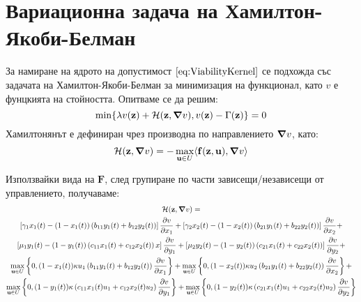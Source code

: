 \section{Вариационна задача на Хамилтон-Якоби-Белман}
За намиране на ядрото на допустимост $\eqref{eq:ViabilityKernel}$ се подхожда със задачата на Хамилтон-Якоби-Белман за минимизация на функционал, като $v$ е фунцкията на стойността. Опитваме се да решим:
\begin{equation}
  \label{eq:HJB}
  \min\{\lambda v(\mathbf{z}) + \mathcal{H}(\mathbf{z}, \grad{v}), v(\mathbf{z}) - \Gamma(\mathbf{z})\} = 0
\end{equation}
Хамилтонянът е дефиниран чрез производна по направлението $\grad{v}$, като:
\begin{equation}
  \label{eq:Hamiltonian}
  \mathcal{H}(\mathbf{z}, \grad{v}) = - \max_{\mathbf{u} \in U} \langle \mathbf{f}(\mathbf{z}, \mathbf{u}), \grad{v} \rangle
\end{equation}

Използвайки вида на $\mathbf{F}$, след групиране по части зависещи/независещи от управлението, получаваме:
\begin{multline}
  \label{eq:HamiltonianFull}
  \mathcal{H}(\mathbf{z}, \grad{v}) = \\
  \left[\gamma_1 x_1(t) - (1-x_1(t)) \left(b_{11} y_1(t) + b_{12} y_2(t)\right) \right] \pdv{v}{x_1} +
  \left[\gamma_2 x_2(t) - (1-x_2(t)) \left(b_{21} y_1(t) + b_{22} y_2(t)\right) \right] \pdv{v}{x_2} + \\
  \left[\mu_1 y_1(t) - (1-y_1(t)) \left(c_{11} x_1(t) + c_{12} x_2(t)\right) x\right] \pdv{v}{y_1} +
  \left[\mu_2 y_2(t) - (1-y_2(t)) \left(c_{21} x_1(t) + c_{22} x_2(t)\right)\right] \pdv{v}{y_2} + \\
  \max_{\mathbf{u} \in U}\left\{0, (1-x_1(t)) \kappa u_1 \left(b_{11} y_1(t) + b_{12} y_2(t)\right) \pdv{v}{x_1}\right\} +
  \max_{\mathbf{u} \in U}\left\{0, (1-x_2(t)) \kappa u_2 \left(b_{21} y_1(t) + b_{22} y_2(t)\right) \pdv{v}{x_2}\right\} + \\
  \max_{\mathbf{u} \in U}\left\{0, (1-y_1(t)) \kappa \left(c_{11} x_1(t) u_1 + c_{12} x_2(t) u_2 \right) \pdv{v}{y_1}\right\} +
  \max_{\mathbf{u} \in U}\left\{0, (1-y_2(t)) \kappa \left(c_{21} x_1(t) u_1 + c_{22} x_2(t) u_2 \right) \pdv{v}{y_2}\right\}
  \end{multline}

